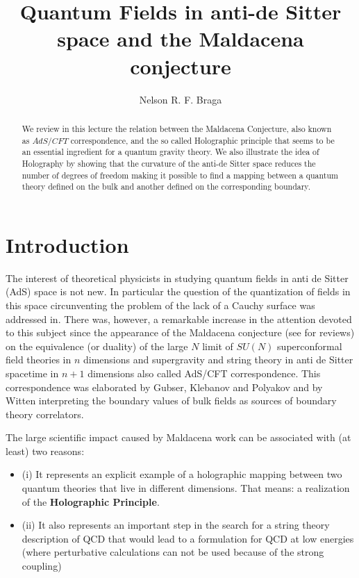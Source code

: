\documentclass[a4paper,twocolumn,prd,groupedaddress,nofootinbib]{revtex4}
\begin{document}
\title{Quantum Fields in anti-de Sitter space and the Maldacena conjecture}
\author{Nelson R. F. Braga}



\begin{abstract}
We  review  in this lecture the relation between the Maldacena Conjecture,
also  known as $AdS/CFT$ correspondence, and  the so called 
Holographic principle that seems to be an essential ingredient for a 
quantum gravity theory. We  also illustrate the idea of Holography by showing 
that the curvature of the anti-de Sitter space reduces the number of degrees
of freedom making it possible to find a mapping between a quantum theory 
defined on the bulk and another defined on the corresponding boundary.
\end{abstract}


\maketitle

\section{Introduction}
The interest of theoretical physicists in studying quantum fields in
anti de Sitter (AdS) space is not new\cite{Fro}.
In particular the question of the quantization of fields in this space
circunventing the problem of the lack of a Cauchy surface
was addressed in\cite{QAdS1,QAdS2}. 
There was, however, a remarkable increase in the attention devoted
to this subject since the appearance of  the Maldacena 
conjecture\cite{Malda} (see \cite{Malda2,Pe} for reviews)  on the equivalence 
(or duality) of the large $N$ limit of $SU(N)$ superconformal 
field theories in $n$ dimensions and supergravity and 
string theory in anti de Sitter spacetime in $n+1$  dimensions
also called AdS/CFT correspondence.
This correspondence was elaborated by  Gubser, Klebanov and Polyakov \cite{GKP}
and by Witten \cite{Wi} interpreting the boundary values of bulk fields as
sources of boundary theory correlators.

The large scientific impact caused by Maldacena work can be associated with
(at least) two reasons: 

\begin{itemize}
\item{(i)} It represents an explicit example of a holographic mapping between 
two quantum theories that live in different dimensions. That means: a realization of 
the  {\bf Holographic Principle}.

\item{(ii)} It also represents an important step  in the search for 
a string theory description of  QCD that would lead to a formulation for QCD 
at low energies (where perturbative calculations can not be used because of the 
strong coupling)
\end{itemize}
\end{document}
